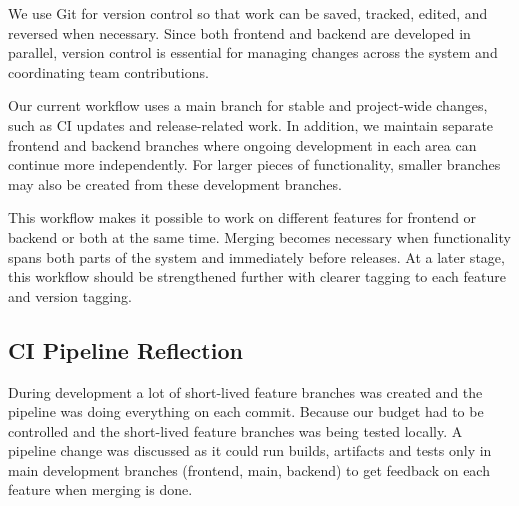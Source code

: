 We use Git for version control so that work can be saved, tracked, edited, and reversed when necessary.
Since both frontend and backend are developed in parallel, version control is essential for managing changes
across the system and coordinating team contributions.

Our current workflow uses a main branch for stable and project-wide changes,
such as CI updates and release-related work.
In addition, we maintain separate frontend and backend branches where ongoing development in each area can continue more independently.
For larger pieces of functionality, smaller branches may also be created from these development branches.

This workflow makes it possible to work on different features for frontend or backend or both at the same time. 
Merging becomes necessary when functionality spans both parts of the system and immediately before releases.
At a later stage, this workflow should be strengthened further with clearer tagging to each feature and version tagging.



\subsection{CI Pipeline Reflection}
During development a lot of short-lived feature branches was created and the pipeline was doing everything on each commit.
Because our budget had to be controlled and the short-lived feature branches was being tested locally.
A pipeline change was discussed as it could run builds, artifacts and tests only in main development branches (frontend, main, backend) to get feedback on each feature when merging is done. 

